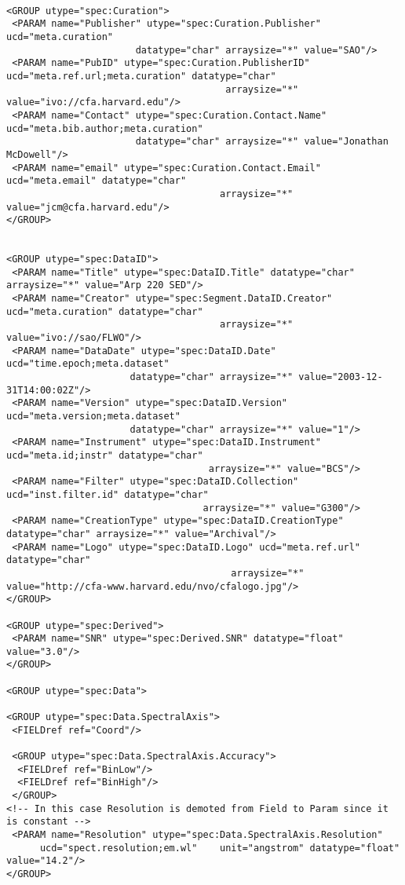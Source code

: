 {\begin{flushleft}
\begin{fmpage}
\begin{verbatim}

<GROUP utype="spec:Curation">
 <PARAM name="Publisher" utype="spec:Curation.Publisher" ucd="meta.curation" 
                       datatype="char" arraysize="*" value="SAO"/>
 <PARAM name="PubID" utype="spec:Curation.PublisherID" ucd="meta.ref.url;meta.curation" datatype="char" 
                                       arraysize="*" value="ivo://cfa.harvard.edu"/>
 <PARAM name="Contact" utype="spec:Curation.Contact.Name" ucd="meta.bib.author;meta.curation" 
                       datatype="char" arraysize="*" value="Jonathan McDowell"/>
 <PARAM name="email" utype="spec:Curation.Contact.Email" ucd="meta.email" datatype="char" 
                                      arraysize="*" value="jcm@cfa.harvard.edu"/>
</GROUP>


<GROUP utype="spec:DataID">
 <PARAM name="Title" utype="spec:DataID.Title" datatype="char" arraysize="*" value="Arp 220 SED"/>
 <PARAM name="Creator" utype="spec:Segment.DataID.Creator" ucd="meta.curation" datatype="char" 
                                      arraysize="*" value="ivo://sao/FLWO"/>
 <PARAM name="DataDate" utype="spec:DataID.Date" ucd="time.epoch;meta.dataset"
                      datatype="char" arraysize="*" value="2003-12-31T14:00:02Z"/>
 <PARAM name="Version" utype="spec:DataID.Version" ucd="meta.version;meta.dataset"
                      datatype="char" arraysize="*" value="1"/>
 <PARAM name="Instrument" utype="spec:DataID.Instrument" ucd="meta.id;instr" datatype="char" 
                                    arraysize="*" value="BCS"/>
 <PARAM name="Filter" utype="spec:DataID.Collection" ucd="inst.filter.id" datatype="char" 
                                   arraysize="*" value="G300"/>
 <PARAM name="CreationType" utype="spec:DataID.CreationType" datatype="char" arraysize="*" value="Archival"/>
 <PARAM name="Logo" utype="spec:DataID.Logo" ucd="meta.ref.url" datatype="char" 
                                        arraysize="*" value="http://cfa-www.harvard.edu/nvo/cfalogo.jpg"/>
</GROUP>

<GROUP utype="spec:Derived">
 <PARAM name="SNR" utype="spec:Derived.SNR" datatype="float" value="3.0"/>
</GROUP>

<GROUP utype="spec:Data">

<GROUP utype="spec:Data.SpectralAxis">
 <FIELDref ref="Coord"/>

 <GROUP utype="spec:Data.SpectralAxis.Accuracy">
  <FIELDref ref="BinLow"/>
  <FIELDref ref="BinHigh"/>
 </GROUP>
<!-- In this case Resolution is demoted from Field to Param since it is constant -->
 <PARAM name="Resolution" utype="spec:Data.SpectralAxis.Resolution" 
      ucd="spect.resolution;em.wl"    unit="angstrom" datatype="float" value="14.2"/>
</GROUP>


\end{verbatim}
\end{fmpage}
\end{flushleft}}
